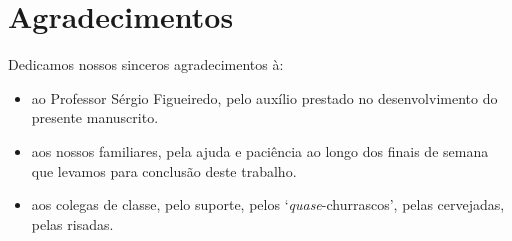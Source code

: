 \chapter*{Agradecimentos}

Dedicamos nossos sinceros agradecimentos à:

\begin{itemize}

    \item ao Professor Sérgio Figueiredo, pelo auxílio prestado no
    desenvolvimento do presente manuscrito.

    \item aos nossos familiares, pela ajuda e paciência ao longo dos finais de
    semana que levamos para conclusão deste trabalho.

    \item aos colegas de classe, pelo suporte, pelos `\emph{quase}-churrascos',
    pelas cervejadas, pelas risadas.

\end{itemize}
